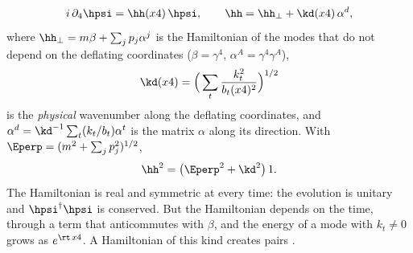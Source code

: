 \begin{equation}
i\,\partial_4\hpsi=\hh(x4)\,\hpsi,\qquad\hh=\hh_\perp+\kd(x4)\,\alpha^{d},
\label{eq:h}
\end{equation}
where $\hh_\perp=m\beta+\sum_jp_j\alpha^{j}$ is the Hamiltonian of the modes that do not depend on
the deflating coordinates ($\beta=\gamma^{4}$, $\alpha^{A}=\gamma^{4}\gamma^{A}$),
\begin{equation}
\kd(x4)=\Big(\sum_t\frac{k_t^{2}}{b_t(x4)^{2}}\Big)^{1/2}
\label{eq:kd}
\end{equation}
is the \emph{physical} wavenumber along the deflating coordinates, and
$\alpha^{d}=\kd^{-1}\sum_t(k_t/b_t)\alpha^{t}$ is the matrix $\alpha$ along its direction. With
$\Eperp=(m^{2}+\sum_jp_j^{2})^{1/2}$,
\begin{equation}
\hh^{2}=\big(\Eperp^{2}+\kd^{2}\big)\,1 .
\label{eq:h2}
\end{equation}
The Hamiltonian is real and symmetric at every time: the evolution is unitary and
$\hpsi^\dagger\hpsi$ is conserved. But the Hamiltonian depends on the time, through a term that
anticommutes with $\beta$, and the energy of a mode with $k_t\neq0$ grows as $e^{\rt\,x4}$. A
Hamiltonian of this kind creates pairs \cite{Parker1969}.

